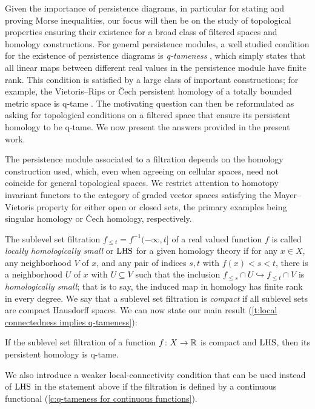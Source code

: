 Given the importance of persistence diagrams, in particular for stating and proving Morse inequalities, our focus will then be on the study of topological properties ensuring their existence for a broad class of filtered spaces and homology constructions.
For general persistence modules, a well studied condition for the existence of persistence diagrams is \emph{q-tameness} \cite{Chazal.2016a,Chazal.2016b}, which simply states that all linear maps between different real values in the persistence module have finite rank.
This condition is satisfied by a large class of important constructions; for example, the Vietoris--Rips or \v Cech persistent homology of a totally bounded metric space is q-tame \cite{Chazal.2014}.
The motivating question can then be reformulated as asking for topological conditions on a filtered space that ensure its persistent homology to be q-tame.
We now present the answers provided in the present work.

The persistence module associated to a filtration depends on the homology construction used, which, even when agreeing on cellular spaces, need not coincide for general topological spaces.
We restrict attention to homotopy invariant functors to the category of graded vector spaces satisfying the Mayer--Vietoris property for either open or closed sets, the primary examples being singular homology or \v{C}ech homology, respectively.

The sublevel set filtration $f_{\leq t} = f^{-1}(-\infty, t]$ of a real valued function $f$ is called \emph{locally homologically small} or \emph{$\mathrm{LHS}$} for a given homology theory if for any $x \in X$, any neighborhood $V$ of $x$, and any pair of indices $s,t$ with $f(x) < s < t$, there is a neighborhood $U$ of $x$ with $U \subseteq V$ such that the inclusion $f_{\leq s} \cap U \hookrightarrow f_{\leq t} \cap V$ is \emph{homologically small}; that is to say, the induced map in homology has finite rank in every degree.
We say that a sublevel set filtration is \emph{compact} if all sublevel sets are compact Hausdorff spaces.
We can now state our main result (\cref{t:local connectedness implies q-tameness}):

\begin{thm*}
	If the sublevel set filtration of a function $f \colon X \to \mathbb{R}$ is compact and	$\mathrm{LHS}$, then its persistent homology is q-tame.
\end{thm*}

\noindent We also introduce a weaker local-connectivity condition that can be used instead of $\mathrm{LHS}$ in the statement above if the filtration is defined by a continuous functional (\cref{c:q-tameness for continuous functions}).

